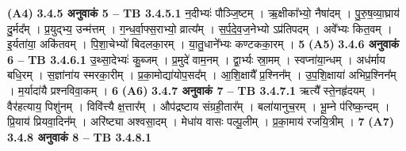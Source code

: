 \documentclass[17pt]{extarticle}
\begin{document}
{{{{{{{{{{{{{{{{{{{                  \newline
                                     \textbf{(A4)} \newline \newline
                \textbf{ 3.4.5     अनुवाकं   5 –} \newline
                                \textbf{ TB 3.4.5.1} \newline
                  न॒दीभ्यः॑ पौञ्जि॒ष्टम् । ऋ॒क्षीका᳚भ्यो॒ नैषा॑दम् । पु॒रु॒ष॒व्या॒घ्राय॑ दु॒र्मद᳚म् । प्र॒युद्भ्य॒ उन्म॑त्तम् । ग॒न्ध॒र्वा॒फ्स॒राभ्यो॒ व्रात्य᳚म् । स॒र्प॒दे॒व॒ज॒नेभ्यो ऽप्र॑तिपदम् । अवे᳚भ्यः कित॒वम् । इ॒र्यता॑या॒ अकि॑तवम् । पि॒शा॒चेभ्यो॑ बिदलका॒रम् । या॒तु॒धाने᳚भ्यः कण्टकका॒रम् । \textbf{ 5} \newline
                  \newline
                                     \textbf{(A5)} \newline \newline
                \textbf{ 3.4.6     अनुवाकं   6 –} \newline
                                \textbf{ TB 3.4.6.1} \newline
                  उ॒थ्सा॒देभ्यः॑ कु॒ब्जम् । प्र॒मुदे॑ वाम॒नम् । द्वा॒र्भ्यः स्रा॒मम् । स्वप्ना॑या॒न्धम् । अध॑र्माय बधि॒रम् । स॒ज्ञांना॑य स्मरका॒रीम् । प्र॒का॒मोद्या॑योप॒सद᳚म् । आ॒शि॒क्षायै᳚ प्र॒श्निन᳚म् । उ॒प॒शि॒क्षाया॑ अभिप्र॒श्निन᳚म् । म॒र्यादा॑यै प्रश्नविवा॒कम् । \textbf{ 6} \newline
                  \newline
                                     \textbf{(A6)} \newline \newline
                \textbf{ 3.4.7     अनुवाकं   7 –} \newline
                                \textbf{ TB 3.4.7.1} \newline
                  ऋत्यै᳚ स्ते॒नहृ॑दयम् । वैर॑हत्याय॒ पिशु॑नम् । विवि॑त्त्यै क्ष॒त्तार᳚म् । औप॑द्रष्टाय संग्रही॒तार᳚म् । बला॑यानुच॒रम् । भू॒म्ने प॑रिष्क॒न्दम् । प्रि॒याय॑ प्रियवा॒दिन᳚म् । अरि॑ष्ट्या अश्वसा॒दम् । मेधा॑य वासः पल्पू॒लीम् । प्र॒का॒माय॑ रजयि॒त्रीम् । \textbf{ 7} \newline
                  \newline
                                     \textbf{(A7)} \newline \newline
                \textbf{ 3.4.8     अनुवाकं   8 –} \newline
                                \textbf{ TB 3.4.8.1} \newline
}}}}}}}}}}}}}}}}}}}
\end{document}
